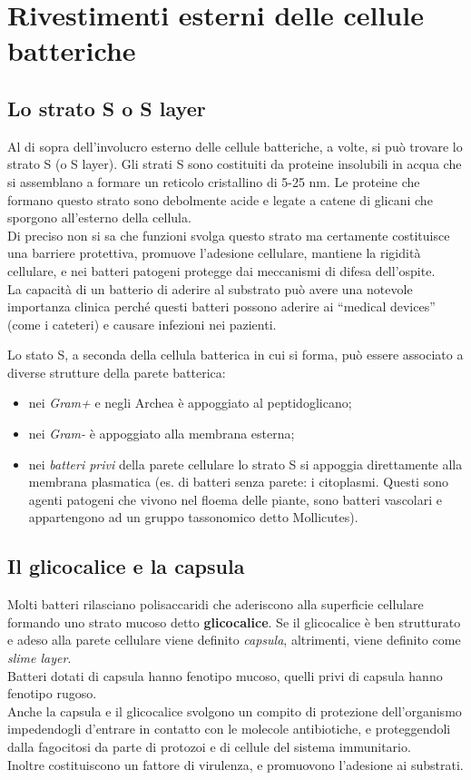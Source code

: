 \documentclass[11pt]{book}
\begin{document}
\section{Rivestimenti esterni delle cellule batteriche}
\subsection{Lo strato S o S layer}

Al di sopra dell’involucro esterno delle cellule batteriche, a volte, si può trovare lo strato S (o S layer).
Gli strati S sono costituiti da proteine insolubili in acqua che si assemblano a formare un reticolo cristallino di 5-25 nm. Le proteine che formano questo strato sono debolmente acide e legate a catene di glicani che sporgono all’esterno della cellula.\\
Di preciso non si sa che funzioni svolga questo strato ma certamente costituisce una barriere protettiva, promuove l’adesione cellulare, mantiene la rigidità cellulare, e nei batteri patogeni protegge dai meccanismi di difesa dell’ospite.\\
La capacità di un batterio di aderire al substrato può avere una notevole importanza clinica perché questi batteri possono aderire ai “medical devices” (come i cateteri) e causare infezioni nei pazienti.

\vspace{1em}
Lo stato S, a seconda della cellula batterica in cui si forma, può essere associato a diverse strutture della parete batterica:
\begin{itemize}
\item nei \emph{Gram+} e negli Archea è appoggiato al peptidoglicano;
\item nei \emph{Gram-} è appoggiato alla membrana esterna;
\item nei \emph{batteri privi} della parete cellulare lo strato S si appoggia direttamente alla membrana plasmatica (es. di batteri senza parete: i citoplasmi. Questi sono agenti patogeni che vivono nel floema delle piante, sono batteri vascolari e appartengono ad un gruppo tassonomico detto Mollicutes).
\end{itemize}
 
\subsection{Il glicocalice e la capsula}

Molti batteri rilasciano polisaccaridi che aderiscono alla superficie cellulare formando uno strato mucoso detto \textbf{glicocalice}. 
Se il glicocalice è ben strutturato e adeso alla parete cellulare viene definito \emph{capsula}, altrimenti, viene definito come \emph{slime layer}.\\ 
Batteri dotati di capsula hanno fenotipo mucoso, quelli privi di capsula hanno fenotipo rugoso.\\
Anche la capsula e il glicocalice svolgono un compito di protezione dell’organismo impedendogli d’entrare in contatto con le molecole antibiotiche, e proteggendoli dalla fagocitosi da parte di protozoi e di cellule del sistema immunitario.\\
Inoltre costituiscono un fattore di virulenza, e promuovono l’adesione ai substrati.
\end{document}
